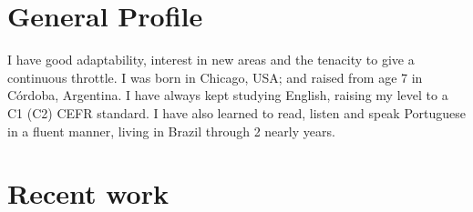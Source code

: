 \documentclass[a4paper,hidelinks]{twentysecondcv} %
\begin{document}
\section{General Profile}

I have good adaptability, interest in new areas and the tenacity to give a continuous throttle. I was born in Chicago, USA; and raised from age 7 in Córdoba, Argentina. 
I have always kept %
studying %
English, raising my level to a C1 (C2) \textsc{CEFR} standard. 
I have also learned to read, listen and speak Portuguese in a fluent manner, living in Brazil through 2 nearly years. 

\section{Recent work}

\begin{twentyshort} %
\end{twentyshort}


\end{document}
